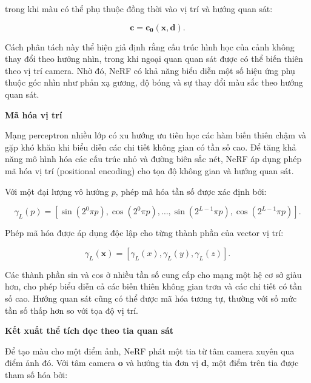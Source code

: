 trong khi màu có thể phụ thuộc đồng thời vào vị trí và hướng quan sát:

\begin{equation}
    \mathbf{c}
    =
    \mathbf{c}_{\boldsymbol{\theta}}
    \left(
        \mathbf{x},
        \mathbf{d}
    \right).
    \label{eq:nerf-color-function}
\end{equation}

Cách phân tách này thể hiện giả định rằng cấu trúc hình học của cảnh không thay đổi theo hướng nhìn, trong khi ngoại quan quan sát được có thể biến thiên theo vị trí camera. Nhờ đó, NeRF có khả năng biểu diễn một số hiệu ứng phụ thuộc góc nhìn như phản xạ gương, độ bóng và sự thay đổi màu sắc theo hướng quan sát.

\noindent\textbf{Mã hóa vị trí}

Mạng perceptron nhiều lớp có xu hướng ưu tiên học các hàm biến thiên chậm và gặp khó khăn khi biểu diễn các chi tiết không gian có tần số cao. Để tăng khả năng mô hình hóa các cấu trúc nhỏ và đường biên sắc nét, NeRF áp dụng phép mã hóa vị trí (positional encoding) \cite{tancik2020fourier} cho tọa độ không gian và hướng quan sát.

Với một đại lượng vô hướng $p$, phép mã hóa tần số được xác định bởi:

\begin{equation}
    \gamma_L(p)
    =
    \left[
        \sin\left(2^{0}\pi p\right),
        \cos\left(2^{0}\pi p\right),
        \ldots,
        \sin\left(2^{L-1}\pi p\right),
        \cos\left(2^{L-1}\pi p\right)
    \right].
    \label{eq:nerf-positional-encoding-scalar}
\end{equation}

Phép mã hóa được áp dụng độc lập cho từng thành phần của vector vị trí:

\begin{equation}
    \gamma_L(\mathbf{x})
    =
    \left[
        \gamma_L(x),
        \gamma_L(y),
        \gamma_L(z)
    \right].
    \label{eq:nerf-positional-encoding-position}
\end{equation}

Các thành phần sin và cos ở nhiều tần số cung cấp cho mạng một hệ cơ sở giàu hơn, cho phép biểu diễn cả các biến thiên không gian trơn và các chi tiết có tần số cao. Hướng quan sát cũng có thể được mã hóa tương tự, thường với số mức tần số thấp hơn so với tọa độ vị trí.

\noindent\textbf{Kết xuất thể tích dọc theo tia quan sát}

Để tạo màu cho một điểm ảnh, NeRF phát một tia từ tâm camera xuyên qua điểm ảnh đó. Với tâm camera $\mathbf{o}$ và hướng tia đơn vị $\mathbf{d}$, một điểm trên tia được tham số hóa bởi:

